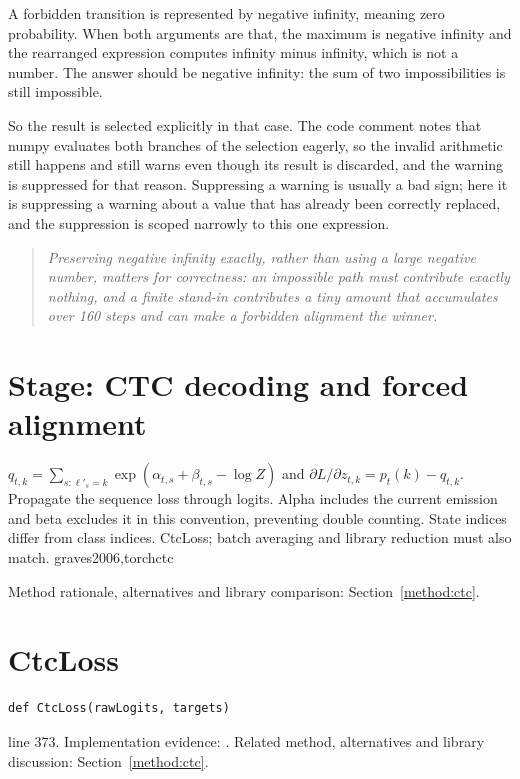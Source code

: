 A forbidden transition is represented by negative infinity, meaning zero probability. When both arguments are that, the maximum is negative infinity and the rearranged expression computes infinity minus infinity, which is not a number. The answer should be negative infinity: the sum of two impossibilities is still impossible.

So the result is selected explicitly in that case. The code comment notes that numpy evaluates both branches of the selection eagerly, so the invalid arithmetic still happens and still warns even though its result is discarded, and the warning is suppressed for that reason. Suppressing a warning is usually a bad sign; here it is suppressing a warning about a value that has already been correctly replaced, and the suppression is scoped narrowly to this one expression.


\begin{quote}\small\itshape Preserving negative infinity exactly, rather than using a large negative number, matters for correctness: an impossible path must contribute exactly nothing, and a finite stand-in contributes a tiny amount that accumulates over 160 steps and can make a forbidden alignment the winner.\end{quote}


\section*{Stage: CTC decoding and forced alignment}
{$q_{t,k}=\sum_{s:\ell'_s=k}\exp(\alpha_{t,s}+\beta_{t,s}-\log Z)$ and
$\partial L/\partial z_{t,k}=p_t(k)-q_{t,k}$.}
{Propagate the sequence loss through logits. Alpha includes the current
emission and beta excludes it in this convention, preventing double counting.
State indices differ from class indices.}
{CtcLoss; batch averaging and library reduction must also match.}
{graves2006,torchctc}


Method rationale, alternatives and library comparison: Section~\ref{method:ctc}.
\section{CtcLoss}\label{fn:train:CtcLoss}
\begin{lstlisting}[style=sig]
def CtcLoss(rawLogits, targets)
\end{lstlisting}
 line 373. Implementation evidence: \cite{code2026}. Related method, alternatives and library discussion: Section~\ref{method:ctc}.


